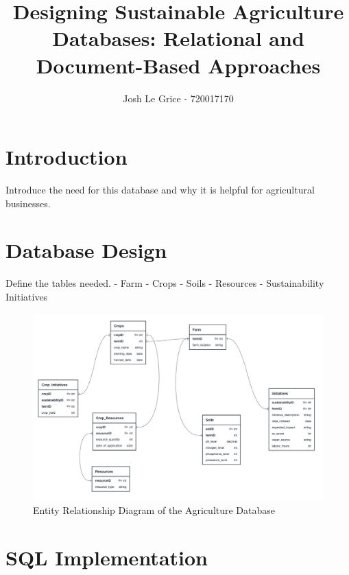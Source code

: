\documentclass[english]{article}
\begin{document}

\title{\bf Designing Sustainable Agriculture Databases: Relational and Document-Based Approaches}
\author{Josh Le Grice - 720017170}
\date{}
\maketitle
\thispagestyle{fancy}


\section{Introduction}
Introduce the need for this database and why it is helpful for agricultural businesses.

\section{Database Design}

Define the tables needed.
- Farm
- Crops
- Soils
- Resources
- Sustainability Initiatives

\begin{figure}[h!]
\centering
\includegraphics[width=\textwidth]{DatabaseDiagram}
\caption{Entity Relationship Diagram of the Agriculture Database}
\end{figure}

\section{SQL Implementation}
\end{document}
